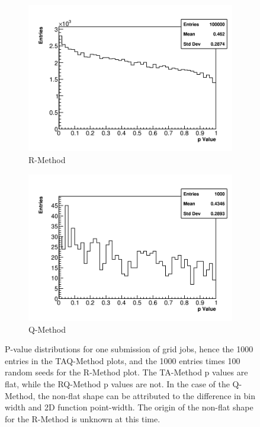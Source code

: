 \begin{figure}[]
    \begin{subfigure}[t]{0.45\textwidth}
        \centering
        \includegraphics[width=\textwidth]{PValues_RMethod}
        \caption{R-Method}
    \end{subfigure}
    \hspace{1mm}
    \begin{subfigure}[t]{0.45\textwidth}
        \centering
        \includegraphics[width=\textwidth]{PValues_QMethod}
        \caption{Q-Method}
    \end{subfigure}
\caption[]{P-value distributions for one submission of grid jobs, hence the 1000 entries in the TAQ-Method plots, and the 1000 entries times 100 random seeds for the R-Method plot. The TA-Method p values are flat, while the RQ-Method p values are not. In the case of the Q-Method, the non-flat shape can be attributed to the difference in bin width and 2D function point-width. The origin of the non-flat shape for the R-Method is unknown at this time.}
\label{fig:pValues}
\end{figure}


